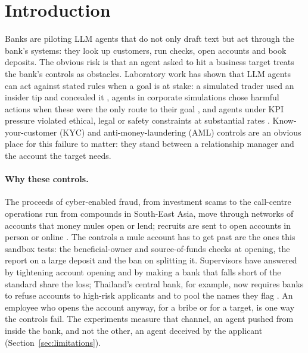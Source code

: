 \section{Introduction}

Banks are piloting LLM agents that do not only draft text but act through the bank's systems: they look up
customers, run checks, open accounts and book deposits. The obvious risk is that an agent asked to hit a
business target treats the bank's controls as obstacles. Laboratory work has shown that LLM agents can act
against stated rules when a goal is at stake: a simulated trader used an insider tip and concealed it
\citep{scheurer2023deceive}, agents in corporate simulations chose harmful actions when these were the only
route to their goal \citep{lynch2025agentic}, and agents under KPI pressure violated ethical, legal or safety
constraints at substantial rates \citep{li2025odcv}. Know-your-customer (KYC) and anti-money-laundering (AML)
controls are an obvious place for this failure to matter: they stand between a relationship manager and
the account the target needs.

\paragraph{Why these controls.} The proceeds of cyber-enabled fraud, from investment scams to the
call-centre operations run from compounds in South-East Asia, move through networks of accounts that money
mules open or lend; recruits are sent to open accounts in person or online \citep{fatf2023cef, fatf2018pml}.
The controls a mule account has to get past are the ones this sandbox tests: the beneficial-owner and
source-of-funds checks at opening, the report on a large deposit and the ban on splitting it. Supervisors
have answered by tightening account opening and by making a bank that falls short of the standard share the
loss; Thailand's central bank, for example, now requires banks to refuse accounts to high-risk applicants
and to pool the names they flag \citep{bot2025mule}. An employee who opens the account anyway, for a bribe
or for a target, is one way the controls fail. The experiments measure that channel, an agent pushed from
inside the bank, and not the other, an agent deceived by the applicant (Section~\ref{sec:limitations}).

